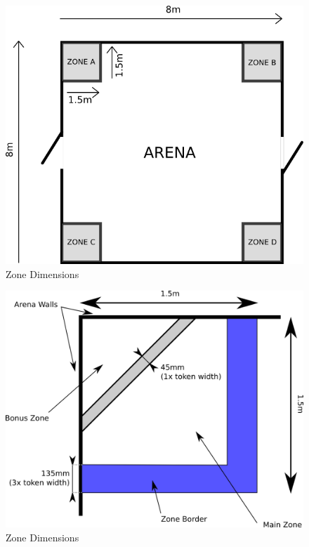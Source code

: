 \begin{figure}
\begin{center}
\includegraphics[keepaspectratio, width=\textwidth]{./images/arenadim.png}
\caption{\label{fig:arena}Zone Dimensions}
\end{center}
\end{figure}

\begin{figure}
\begin{center}
\includegraphics[keepaspectratio, scale =1]{./images/zone.png}
\caption{\label{fig:zone}Zone Dimensions}
\end{center}
\end{figure}


